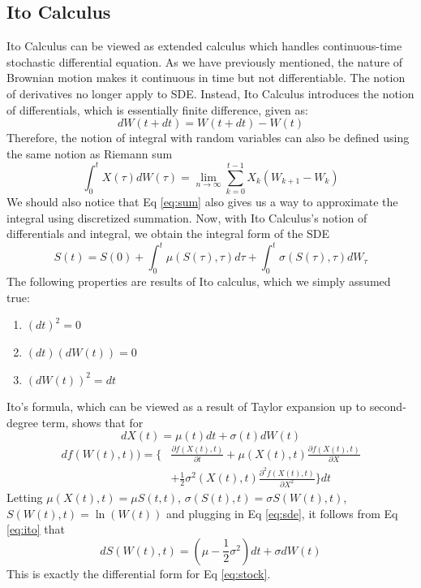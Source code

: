 \documentclass[%
 reprint,
 amsmath,amssymb,
 aps,
 nofootinbib,
 showpacs
]{revtex4-1}
\begin{document}
\subsection{Ito Calculus}
Ito Calculus can be viewed as extended calculus which handles continuous-time stochastic differential equation.
As we have previously mentioned, the nature of Brownian motion makes it continuous in time but not differentiable.
The notion of derivatives no longer apply to SDE.
Instead, Ito Calculus introduces the notion of differentials, which is essentially finite difference, given as:
\begin{equation*}
dW(t+dt) = W(t+dt) - W(t)
\end{equation*}
Therefore, the notion of integral with random variables can also be defined using the same notion as Riemann sum
\begin{equation} \label{eq:sum}
\int_{0}^t X(\tau)dW(\tau) = \lim_{n\to\infty}\sum_{k=0}^{t-1} X_{k} (W_{k+1}-W_k)
\end{equation}
We should also notice that Eq \ref{eq:sum} also gives us a way to approximate the integral using discretized summation.
Now, with Ito Calculus's notion of differentials and integral, we obtain the integral form of the SDE
\begin{equation}
S(t) = S(0) + \int_0^t \mu(S(\tau),\tau)d\tau + \int_0^t\sigma(S(\tau),\tau)dW_\tau
\end{equation}
The following properties are results of Ito calculus, which we simply assumed true:
\begin{enumerate}
\item $(dt)^2= 0$
\item $(dt)(dW(t))=0$
\item $(dW(t))^2 = dt$
\end{enumerate}
Ito's formula, which can be viewed as a result of Taylor expansion up to second-degree term, shows that for
\begin{equation*}
dX(t) = \mu(t) dt + \sigma(t) dW(t)
\end{equation*}
\begin{equation}\label{eq:ito}
\begin{aligned}
df(W(t),t)) = \{&\frac{\partial f(X(t),t)}{\partial t} + \mu(X(t),t)\frac{\partial f(X(t),t)}{\partial X}\\
& + \frac{1}{2}\sigma^2(X(t),t)\frac{\partial^2f(X(t),t)}{\partial X^2}\} dt
\end{aligned}
\end{equation}
Letting $\mu(X(t),t) = \mu S(t,t)$, $\sigma(S(t),t) = \sigma S(W(t),t)$, $S(W(t),t) = \ln(W(t))$ and plugging in Eq \ref{eq:sde}, it follows from Eq \ref{eq:ito} that
\begin{equation}
dS(W(t),t) = (\mu-\frac{1}{2}\sigma^2)dt + \sigma dW(t)
\end{equation}
This is exactly the differential form for Eq \ref{eq:stock}.
\end{document}
